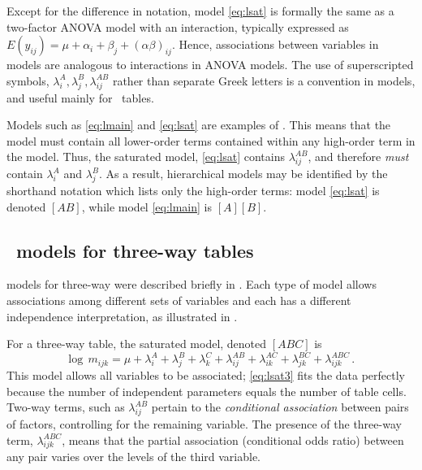 \documentclass[11pt]{book}\usepackage[]{graphicx}\usepackage[]{color}
\begin{document}
Except for the difference in notation, model \eqref{eq:lsat} is formally the same
as a two-factor ANOVA model with an interaction, typically expressed as
$  E ( y_{ij} ) = \mu  +  \alpha_i  +  \beta_j +(\alpha  \beta)_{ij}
$.
Hence, associations between variables in \loglin models are
analogous to interactions in ANOVA models.
The use of superscripted symbols,
$\lambda_i^A, \lambda_j^B , \lambda_{ij}^{AB}$ rather than separate
Greek letters is a convention in \loglin models, and useful mainly
for \mway\ tables.

Models such as \eqref{eq:lmain} and \eqref{eq:lsat} are
examples of .
This means that the model must contain all lower-order terms contained
within any high-order term in the model.
Thus, the saturated model, \eqref{eq:lsat} contains $\lambda_{ij}^{AB}$,
and therefore \emph{must} contain $\lambda_i^A $ and $\lambda_j^B$.
As a result, hierarchical models may be identified by the shorthand
notation which lists only the high-order terms: model \eqref{eq:lsat}
is denoted $[A B]$, while model \eqref{eq:lmain} is $[A] [B]$.

\subsection{\Loglin\ models for three-way tables}\label{sec:loglin-3way}
\Loglin models for three-way \ctabs
were described briefly in .
Each type of model allows associations among different sets of variables
and each has a different independence interpretation, as illustrated in
.

For a three-way table, the saturated model, denoted $[ABC]$ is
\begin{equation} \label{eq:lsat3}
  \log \,  m_{ijk}  =
  \mu  +  \lambda_i^A
  +  \lambda_j^B
  +  \lambda_k^C
  +  \lambda_{ij}^{AB}
  +  \lambda_{ik}^{AC}
  +  \lambda_{jk}^{BC}
  +  \lambda_{ijk}^{ABC}
  \period
\end{equation}
This model allows all variables to be associated; \eqref{eq:lsat3} fits the data perfectly because
the number of independent parameters equals the number of table cells.
Two-way terms, such as $\lambda_{ij}^{AB}$ pertain to the
\emph{conditional association} between pairs of factors,
controlling for the remaining variable.
The presence of the three-way term, $\lambda_{ijk}^{ABC}$,
means that the partial association (conditional odds ratio) between any pair
varies over the levels of the third variable.
\end{document}

